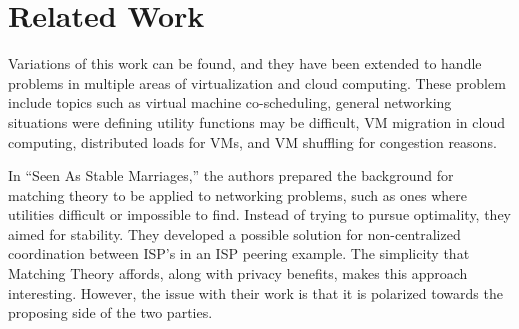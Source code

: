 \documentclass[conference]{IEEEtran}
\begin{document}
\begin{table}[h]
     \newline
     \caption{Comparison III}
     \label{compIII}
\end{table}

\section{Related Work}
Variations of this work can be found, and they have been extended to handle problems in multiple areas of virtualization and cloud computing.  These problem include topics such as virtual machine co-scheduling, general networking situations were defining utility functions may be difficult, VM migration in cloud computing, distributed loads for VMs, and VM shuffling for congestion reasons.

In “Seen As Stable Marriages,” the authors prepared the background for matching theory to be applied to networking problems, such as ones where utilities difficult or impossible to find.  Instead of trying to pursue optimality, they aimed for stability.  They developed a possible solution for non-centralized coordination between ISP’s in an ISP peering example.  The simplicity that Matching Theory affords, along with privacy benefits, makes this approach interesting.  However, the issue with their work is that it is polarized towards the proposing side of the two parties.  
\end{document}
